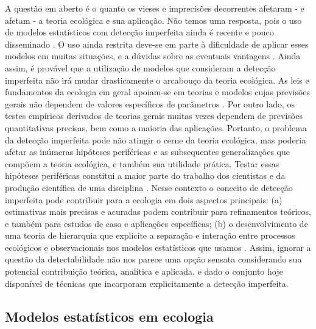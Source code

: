 \documentclass[12pt, A4]{article}
\begin{document}
A questão em aberto é o quanto os vieses e imprecisões decorrentes afetaram - e
afetam - a teoria ecológica e sua aplicação. Não temos uma resposta,
pois o uso de modelos estatísticos com detecção imperfeita ainda é
recente e pouco disseminado 
\citep{williams2002}. O uso ainda restrita deve-se em parte à
dificuldade de aplicar esses modelos em muitas situações, e a dúvidas
sobre as eventuais vantagens
\citep{RD2008,banks2014}. 
Ainda assim, é provável que a utilização de
modelos que consideram a detecção imperfeita não irá mudar
drasticamente o arcabouço da teoria ecológica. As leis e fundamentos
da ecologia em geral apoiam-se em teorias e modelos cujas
previsões gerais não dependem de valores específicos de parâmetros
\citep{scheinerbook2011}. Por outro lado, os testes empíricos
derivados de teorias gerais muitas vezes dependem de previsões
quantitativas precisas, bem como a maioria das aplicações. Portanto, o
problema da detecção imperfeita pode não atingir o cerne da teoria
ecológica, mas poderia afetar as inúmeras hipóteses periféricas e as
subsequentes generalizações que compõem a teoria ecológica, e também
sua utilidade prática. Testar essas hipóteses periféricas constitui a
maior parte do trabalho dos cientistas e da produção científica de uma
disciplina \citep{kuhn1970}.
Nesse contexto o conceito de detecção
imperfeita pode contribuir para a ecologia em dois aspectos
principais: (a) estimativas mais precisas e acuradas podem contribuir
para refinamentos teóricos, e também para estudos de caso e aplicações
específicas;  (b) o desenvolvimento de uma teoria de hierarquia que
explicite a separação e interação entre  processos ecológicos e
observacionais nos modelos estatísticos que usamos \citep{RD2008}. 
Assim, ignorar a questão da detectabilidade não nos parece uma
opção sensata considerando sua potencial contribuição teórica,
analítica e aplicada, e dado o conjunto hoje disponível de técnicas
que incorporam explicitamente a detecção imperfeita.

\subsection*{Modelos estatísticos em ecologia}
\label{sec:model-estat-em}
\end{document}
